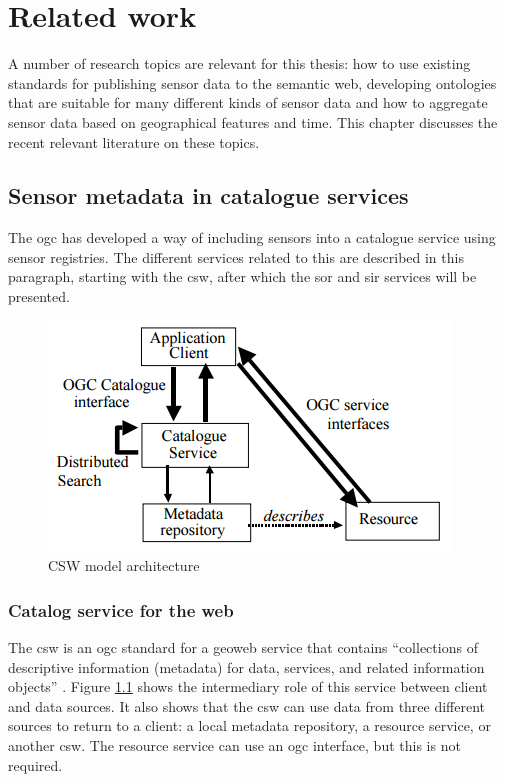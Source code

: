 

\chapter{Related work}
\label{chap:rw}
A number of research topics are relevant for this thesis: how to use existing standards for publishing sensor data to the semantic web, developing ontologies that are suitable for many different kinds of sensor data and how to aggregate sensor data based on geographical features and time. This chapter discusses the recent relevant literature on these topics.  

\section{Sensor metadata in catalogue services}
The \ac{ogc} has developed a way of including sensors into a catalogue service using sensor registries. The different services related to this are described in this paragraph, starting with the \acf{csw}, after which the \acf{sor} and \acf{sir} services will be presented.

\begin{figure}
	\centering
	\includegraphics[width=0.6\linewidth]{UML/CSW.png}
	\caption{CSW model architecture \citep[p. 26]{GEO:OGC2}}
	\label{fig:CSW}
\end{figure}

\subsection{Catalog service for the web}
\label{par:CSW}
 The \ac{csw} is an \ac{ogc} standard for a geoweb service that contains \enquote{collections of descriptive information (metadata) for data, services, and related information objects} \citep[p. xiv]{GEO:OGC2}. Figure \ref{fig:CSW} shows the intermediary role of this service between client and data sources. It also shows that the \ac{csw} can use data from three different sources to return to a client: a local metadata repository, a resource service, or another \ac{csw}. The resource service can use an \ac{ogc} interface, but this is not required. 
 
